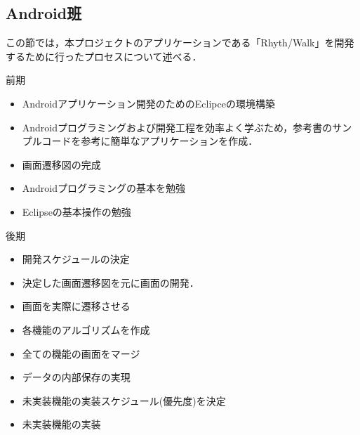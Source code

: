 \subsection{Android班}

\par この節では，本プロジェクトのアプリケーションである「Rhyth/Walk」を開発するために行ったプロセスについて述べる．
\par 前期
\begin{itemize}

\item Androidアプリケーション開発のためのEclipceの環境構築
\item Androidプログラミングおよび開発工程を効率よく学ぶため，参考書のサンプルコードを参考に簡単なアプリケーションを作成．
\item 画面遷移図の完成
\item Androidプログラミングの基本を勉強
\item Eclipseの基本操作の勉強
\end{itemize}

\par 後期
\begin{itemize}
\item 開発スケジュールの決定
\item 決定した画面遷移図を元に画面の開発．
\item 画面を実際に遷移させる
\item 各機能のアルゴリズムを作成
\item 全ての機能の画面をマージ
\item データの内部保存の実現
\item 未実装機能の実装スケジュール(優先度)を決定
\item 未実装機能の実装
\end{itemize}

 
